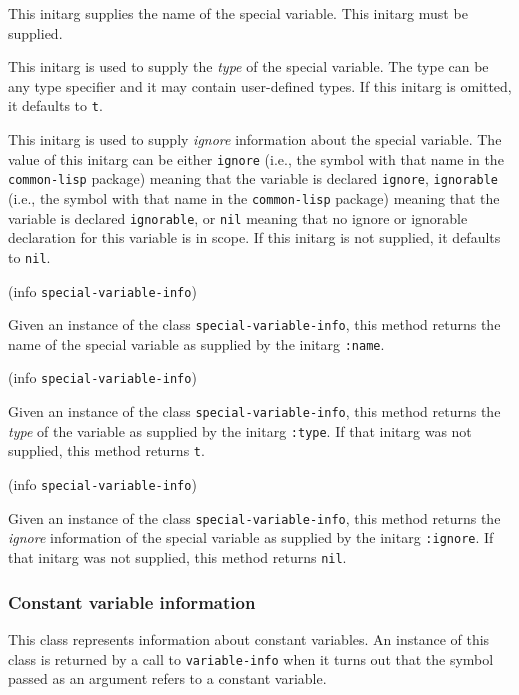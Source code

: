 
This initarg supplies the name of the special variable.  This initarg
must be supplied. 


This initarg is used to supply the \emph{type} of the special
variable.  The type can be any type specifier and it may contain
user-defined types.  If this initarg is omitted, it defaults to
\texttt{t}. 


This initarg is used to supply \emph{ignore} information about the
special variable.  The value of this initarg can be either
\texttt{ignore} (i.e., the symbol with that name in the
\texttt{common-lisp} package) meaning that the variable is declared
\texttt{ignore}, \texttt{ignorable} (i.e., the symbol with that name
in the \texttt{common-lisp} package) meaning that the variable is
declared \texttt{ignorable}, or \texttt{nil} meaning that no ignore or
ignorable declaration for this variable is in scope.  If this initarg
is not supplied, it defaults to \texttt{nil}.

 {(info {\tt special-variable-info})}

Given an instance of the class \texttt{special-variable-info}, this
method returns the name of the special variable as supplied by the
initarg \texttt{:name}.

 {(info {\tt special-variable-info})}

Given an instance of the class \texttt{special-variable-info}, this
method returns the \emph{type} of the variable as supplied by the
initarg \texttt{:type}.  If that initarg was not supplied, this method
returns \texttt{t}.

 {(info {\tt special-variable-info})}

Given an instance of the class \texttt{special-variable-info}, this
method returns the \emph{ignore} information of the special variable as
supplied by the initarg \texttt{:ignore}.  If that initarg was not
supplied, this method returns \texttt{nil}.

\subsubsection{Constant variable information}


This class represents information about constant variables.   An
instance of this class is returned by a call to \texttt{variable-info}
when it turns out that the symbol passed as an argument refers to a
constant variable.

